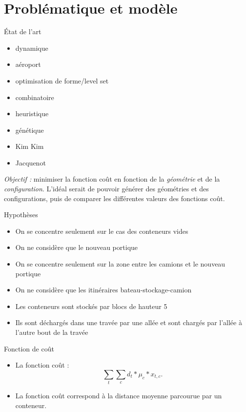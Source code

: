 \section{Problématique et modèle}

\begin{frame}{\'Etat de l'art}
  \begin{itemize}
  \item dynamique \cite{rekik2015}
  \item aéroport \cite{gotteland2004}
  \item optimisation de forme/level set \cite{allaire2006}
  \item combinatoire \cite{ndiaye2015}
  \item heuristique
  \item génétique
  \item Kim Kim \cite{kim98}
  \item Jacquenot \cite{jacquenot2010}
  \end{itemize}
  \vfill
  \emph{Objectif : } minimiser la fonction coût en fonction de la \emph{géométrie} et de la \emph{configuration}.
  \vfill
  L'idéal serait de pouvoir générer des géométries et des configurations, puis de comparer les différentes valeurs des fonctions coût. 
  \vfill  
\end{frame}

\begin{frame}{Hypothèses}
  \begin{itemize}
  \item On se concentre seulement sur le cas des conteneurs vides
    \vfill
  \item On ne considère que le nouveau portique
    \vfill
  \item On se concentre seulement sur la zone entre les camions et le nouveau portique
    \vfill
  \item On ne considère que les itinéraires bateau-stockage-camion
    \vfill
  \item Les conteneurs sont stockés par blocs de hauteur 5
    \vfill
  \item Ils sont déchargés dans une travée par une allée et sont chargés par l'allée à l'autre bout de la travée
    \vfill
  \end{itemize}
  \vfill
\end{frame}

\begin{frame}{Fonction de coût}
  \vfill
  \begin{itemize}
  \item  La fonction coût  : 
    \vfill
    $$ \sum_t \sum_c d_t* \mu_c* x_{t,c}.  $$
    \vfill
  \item La fonction coût correspond à la distance moyenne parcourue par un conteneur.
  \end{itemize}
  \vfill
\end{frame}

